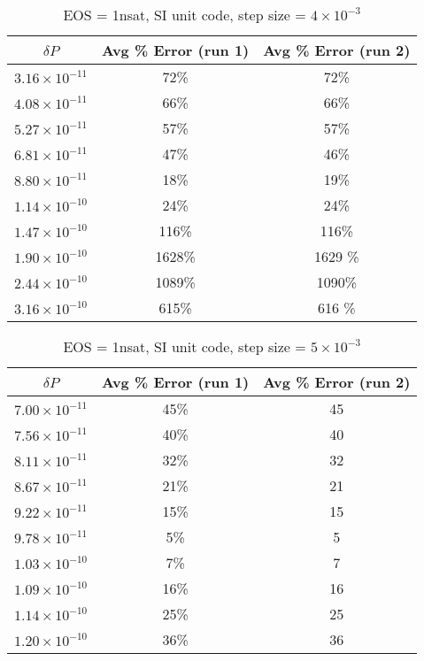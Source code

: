 \documentclass[11pt]{article}
\numberwithin{equation}{section}
\begin{document}
\begin{table}[h]
\caption{EOS = 1nsat, SI unit code,  step size = $4 \times 10^{-3}$ }
\centering
\begin{tabular}{|c | c| c|} \hline
$\delta P$ &  Avg \% Error (run 1) &  Avg \% Error (run 2)  \\ \hline
$3.16 \times 10^{-11}$ & 72\%  & 72\% \\
$4.08 \times 10^{-11}$  & 66\% & 66\%  \\
$5.27 \times 10^{-11}$  & 57\% & 57\% \\
$6.81 \times 10^{-11}$  & 47\% & 46\% \\
$8.80 \times 10^{-11}$  & 18\% & 19\%  \\
$1.14 \times 10^{-10}$  & 24\% & 24\%\\
$1.47 \times 10^{-10}$  & 116\% & 116\%\\
$1.90 \times 10^{-10}$  & 1628\% & 1629 \%\\
$2.44 \times 10^{-10}$  & 1089\% &1090\% \\
$3.16 \times 10^{-10}$  & 615\% & 616 \% \\
\hline
\end{tabular}
\end{table}

\begin{table}[h]
\caption{EOS = 1nsat, SI unit code,  step size = $5 \times 10^{-3}$ }
\centering
\begin{tabular}{|c | c| c|} \hline
$\delta P$ &  Avg \% Error (run 1) &  Avg \% Error (run 2)  \\ \hline
$7.00 \times 10^{-11}$  & 45\%  & 45 \\
$7.56 \times 10^{-11}$  & 40\% &  40 \\
$8.11 \times 10^{-11}$  &  32\% &  32\\
$8.67 \times 10^{-11}$  &  21\% &  21\\
$9.22 \times 10^{-11}$  &  15\% &   15\\
$9.78 \times 10^{-11}$  &  5\% &  5\\
$1.03 \times 10^{-10}$  & 7\% & 7\\
$1.09 \times 10^{-10}$  & 16\% & 16\\
$1.14 \times 10^{-10}$  &  25\% & 25\\
$1.20 \times 10^{-10}$  &  36\% &  36\\
\hline
\end{tabular}
\end{table}
\end{document}
